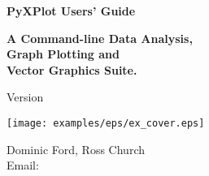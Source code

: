 \documentclass[a4paper,onecolumn,11pt]{book}
\begin{document}
\begin{titlepage}
\normalsize
\vspace*{0.5cm}
\begin{center}
{\Huge \bf PyXPlot Users' Guide}\\
\end{center}
\vspace*{0.5cm}
\begin{center}
{\LARGE \bf A Command-line Data Analysis, \\ \vspace{2mm} Graph Plotting and \\ \vspace{2mm} Vector Graphics Suite. \\}
\end{center}
\vspace*{0.5cm}
\begin{center}
{\Large Version \version \\}
\end{center}
\vspace*{0.0cm}
\begin{center}
\texttt{[image: examples/eps/ex\_cover.eps]}
\end{center}
\vspace*{0.0cm}
\begin{center}
{\Large Dominic Ford, Ross Church \\ \vspace{2mm} Email:  \\ }
\end{center}
\vspace*{0.5cm}
\begin{center}
{\Large \reldate \\}
\end{center}
\end{titlepage}


\tableofcontents

\listoffigures
{}








\appendix











\printindex
\end{document}
